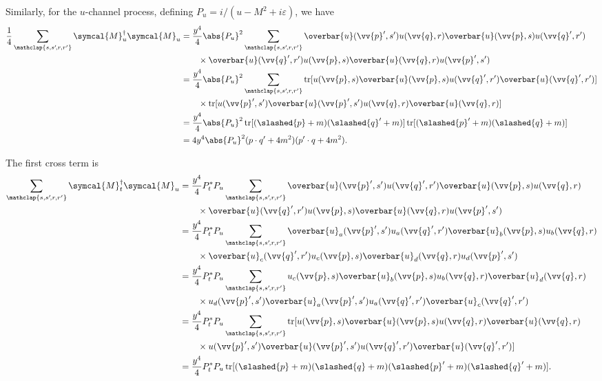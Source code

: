 \documentclass[fleqn]{NotesClass}
\newcommand{\hermit}{{\dagger}}
\newcommand{\amplitude}{\symcal{M}}
\DeclareMathOperator{\tr}{tr}
\newcommand{\diracadjoint}[1]{\overbar{#1}}
\begin{document}
    Similarly, for the \(u\)-channel process, defining \(P_u = i/(u - M^2 + i\varepsilon)\), we have
    \begin{align}
        \frac{1}{4} \sum_{\mathclap{s, s'\!, r, r'}} \amplitude_u^\hermit \amplitude_u &= \frac{y^4}{4} \abs{P_u}^2 \sum_{\mathclap{s, s'\!, r, r'}} \diracadjoint{u}(\vv{p}', s') u(\vv{q}, r) \diracadjoint{u}(\vv{p}, s) u(\vv{q}', r') \notag\\
        &\qquad\times\diracadjoint{u}(\vv{q}', r') u(\vv{p}, s) \diracadjoint{u}(\vv{q}, r) u(\vv{p}', s')\\
        &= \frac{y^4}{4} \abs{P_u}^2 \sum_{\mathclap{s, s'\!, r, r'}} \tr[u(\vv{p}, s)\diracadjoint{u}(\vv{p}, s)u(\vv{q}', r')\diracadjoint{u}(\vv{q}', r')] \notag\\
        &\qquad \times \tr[u(\vv{p}', s')\diracadjoint{u}(\vv{p}', s') u(\vv{q}, r) \diracadjoint{u}(\vv{q}, r)]\\
        &= \frac{y^4}{4} \abs{P_u}^2 \tr[(\slashed{p} + m)(\slashed{q}' + m)] \tr[(\slashed{p}' + m)(\slashed{q} + m)]\\
        &= 4y^4\abs{P_u}^2(p \cdot q' + 4m^2)(p' \cdot q + 4m^2).
    \end{align}
    
    The first cross term is
    \begingroup
    \allowdisplaybreaks
    \begin{align}
        \sum_{\mathclap{s, s'\!, r, r'}} \amplitude_t^\hermit \amplitude_u &= \frac{y^4}{4} P_t^*P_u \sum_{\mathclap{s, s'\!, r, r'}} \diracadjoint{u}(\vv{p}'
        , s') u(\vv{q}', r') \diracadjoint{u}(\vv{p}, s) u(\vv{q}, r)\notag\\
        &\qquad \times\diracadjoint{u}(\vv{q}', r') u(\vv{p}, s) \diracadjoint{u}(\vv{q}, r) u(\vv{p}', s')\\
        &= \frac{y^4}{4} P_t^*P_u \sum_{\mathclap{s, s'\!, r, r'}} \diracadjoint{u}_a(\vv{p}', s') u_a(\vv{q}', r') \diracadjoint{u}_b(\vv{p}, s) u_b(\vv{q}, r)\notag\\
        &\qquad \times\diracadjoint{u}_c(\vv{q}', r') u_c(\vv{p}, s) \diracadjoint{u}_d(\vv{q}, r) u_d(\vv{p}', s')\\
        &= \frac{y^4}{4} P_t^*P_u \sum_{\mathclap{s, s'\!, r, r'}} u_c(\vv{p}, s) \diracadjoint{u}_b(\vv{p}, s) u_b(\vv{q}, r) \diracadjoint{u}_d(\vv{q}, r) \notag\\
        &\qquad \times u_d(\vv{p}', s') \diracadjoint{u}_a(\vv{p}', s') u_a(\vv{q}', r') \diracadjoint{u}_c(\vv{q}', r')\\
        &= \frac{y^4}{4} P_t^*P_u \sum_{\mathclap{s, s'\!, r, r'}} \tr[u(\vv{p}, s)\diracadjoint{u}(\vv{p}, s) u(\vv{q}, r) \diracadjoint{u}(\vv{q}, r) \notag\\
        &\qquad \times u(\vv{p}', s') \diracadjoint{u}(\vv{p}', s') u(\vv{q}', r') \diracadjoint{u}(\vv{q}', r')]\\
        &= \frac{y^4}{4} P_t^*P_u \tr[(\slashed{p} + m) (\slashed{q} + m) (\slashed{p}' + m) (\slashed{q}' + m)].
    \end{align}
    \endgroup
    
\end{document}
